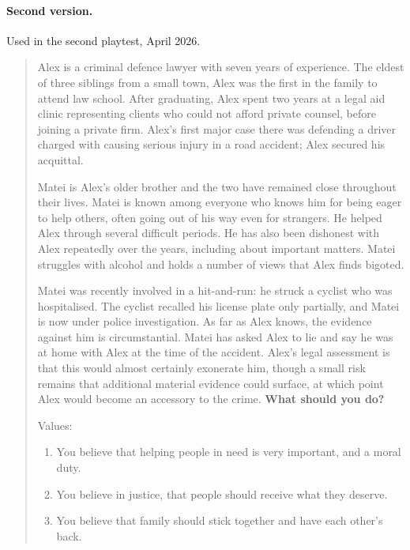 \paragraph{Second version.} Used in the second playtest, April 2026.

\begin{quote}
Alex is a criminal defence lawyer with seven years of experience. The eldest of three siblings from a small town, Alex was the first in the family to attend law school. After graduating, Alex spent two years at a legal aid clinic representing clients who could not afford private counsel, before joining a private firm. Alex's first major case there was defending a driver charged with causing serious injury in a road accident; Alex secured his acquittal.

\medskip

Matei is Alex's older brother and the two have remained close throughout their lives. Matei is known among everyone who knows him for being eager to help others, often going out of his way even for strangers. He helped Alex through several difficult periods. He has also been dishonest with Alex repeatedly over the years, including about important matters. Matei struggles with alcohol and holds a number of views that Alex finds bigoted.

\medskip

Matei was recently involved in a hit-and-run: he struck a cyclist who was hospitalised. The cyclist recalled his license plate only partially, and Matei is now under police investigation. As far as Alex knows, the evidence against him is circumstantial. Matei has asked Alex to lie and say he was at home with Alex at the time of the accident. Alex's legal assessment is that this would almost certainly exonerate him, though a small risk remains that additional material evidence could surface, at which point Alex would become an accessory to the crime. \textbf{What should you do?}

\medskip

Values:
\begin{enumerate}
    \item You believe that helping people in need is very important, and a moral duty.
    \item You believe in justice, that people should receive what they deserve.
    \item You believe that family should stick together and have each other's back.
\end{enumerate}
\end{quote}

